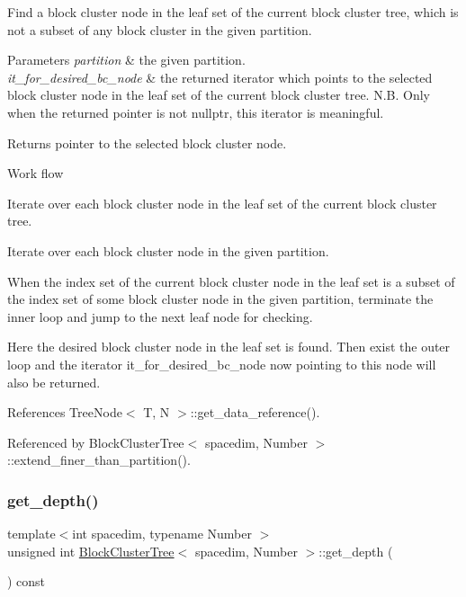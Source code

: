 Find a block cluster node in the leaf set of the current block cluster tree, which is not a subset of any block cluster in the given partition. 
\begin{DoxyParams}{Parameters}
{\em partition} & the given partition. \\
\hline
{\em it\+\_\+for\+\_\+desired\+\_\+bc\+\_\+node} & the returned iterator which points to the selected block cluster node in the leaf set of the current block cluster tree. N.\+B. Only when the returned pointer is not {\ttfamily nullptr}, this iterator is meaningful. \\
\hline
\end{DoxyParams}
\begin{DoxyReturn}{Returns}
pointer to the selected block cluster node. 
\end{DoxyReturn}

\begin{DoxyDescription}
\item[Work flow ]

Iterate over each block cluster node in the leaf set of the current block cluster tree.

Iterate over each block cluster node in the given partition.

When the index set of the current block cluster node in the leaf set is a subset of the index set of some block cluster node in the given partition, terminate the inner loop and jump to the next leaf node for checking.

Here the desired block cluster node in the leaf set is found. Then exist the outer loop and the iterator {\ttfamily it\+\_\+for\+\_\+desired\+\_\+bc\+\_\+node} now pointing to this node will also be returned.


\end{DoxyDescription}

References Tree\+Node$<$ T, N $>$\+::get\+\_\+data\+\_\+reference().



Referenced by Block\+Cluster\+Tree$<$ spacedim, Number $>$\+::extend\+\_\+finer\+\_\+than\+\_\+partition().

\mbox{\label{classBlockClusterTree_ab6c57acfcc5dfbbef04f028e6b9c749d}} 
\subsubsection{\texorpdfstring{get\+\_\+depth()}{get\_depth()}}
{\footnotesize\ttfamily template$<$int spacedim, typename Number $>$ \\
unsigned int \hyperlink{classBlockClusterTree}{Block\+Cluster\+Tree}$<$ spacedim, Number $>$\+::get\+\_\+depth (\begin{DoxyParamCaption}{ }\end{DoxyParamCaption}) const}

